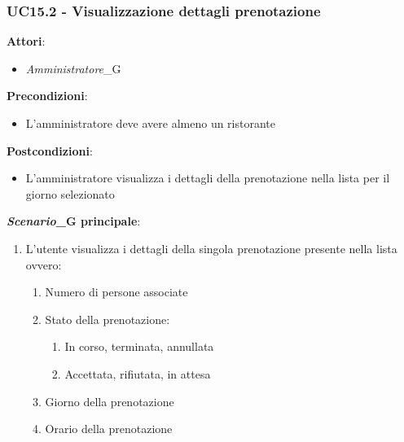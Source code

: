 \subsubsection{UC15.2 - Visualizzazione dettagli prenotazione}\label{usecase:15_2}
\textbf{Attori}:
\begin{itemize}
    \item \textit{Amministratore}_G
\end{itemize}
\textbf{Precondizioni}:
\begin{itemize}
    \item L'amministratore deve avere almeno un ristorante
\end{itemize}
\textbf{Postcondizioni}:
\begin{itemize}
    \item L'amministratore visualizza i dettagli della prenotazione nella lista per il giorno selezionato
\end{itemize}
\textbf{\textit{Scenario}_G principale}:
\begin{enumerate}
    \item L'utente visualizza i dettagli della singola prenotazione presente nella lista ovvero:
    \begin{enumerate}
        \item Numero di persone associate
        \item Stato della prenotazione:
         \begin{enumerate}
           \item In corso, terminata, annullata
            \item Accettata, rifiutata, in attesa
       \end{enumerate}
    \item Giorno della prenotazione
    \item Orario della prenotazione
    \end{enumerate}
\end{enumerate}
\newpage